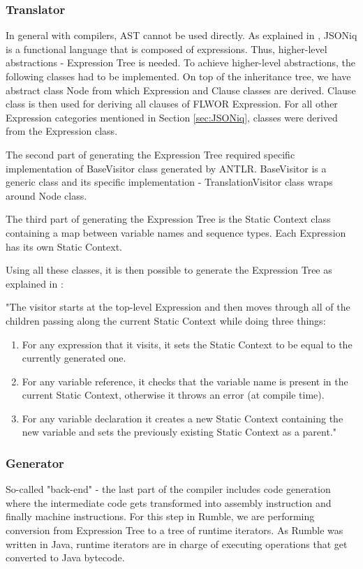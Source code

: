 \subsubsection{Translator}
In general with compilers, AST cannot be used directly. As explained in \cite{RumbleMLThesis}, JSONiq is a functional language that is composed of expressions. Thus, higher-level abstractions - Expression Tree is needed. To achieve higher-level abstractions, the following classes had to be implemented. On top of the inheritance tree, we have abstract class Node from which Expression and Clause classes are derived. Clause class is then used for deriving all clauses of FLWOR Expression. For all other Expression categories mentioned in Section \ref{sec:JSONiq}, classes were derived from the Expression class. 

The second part of generating the Expression Tree required specific implementation of BaseVisitor class generated by ANTLR. BaseVisitor is a generic class and its specific implementation - TranslationVisitor class wraps around Node class. 

The third part of generating the Expression Tree is the Static Context class containing a map between variable names and sequence types. Each Expression has its own Static Context.

Using all these classes, it is then possible to generate the Expression Tree as explained in \cite{RumbleThesis}: 

"The visitor starts at the top-level Expression and then moves through all of the children passing along the current Static Context while doing three things:
\begin{enumerate}
	\item For any expression that it visits, it sets the Static Context to be equal to the currently generated one.
	\item For any variable reference, it checks that the variable name is present in the current Static Context, otherwise it throws an error (at compile time).
	\item For any variable declaration it creates a new Static Context containing the new variable and sets the previously existing Static Context as a parent."
\end{enumerate}

\subsubsection{Generator}
\label{sec:Generator}
So-called "back-end" - the last part of the compiler includes code generation where the intermediate code gets transformed into assembly instruction and finally machine instructions. For this step in Rumble, we are performing conversion from Expression Tree to a tree of runtime iterators. As Rumble was written in Java, runtime iterators are in charge of executing operations that get converted to Java bytecode.

